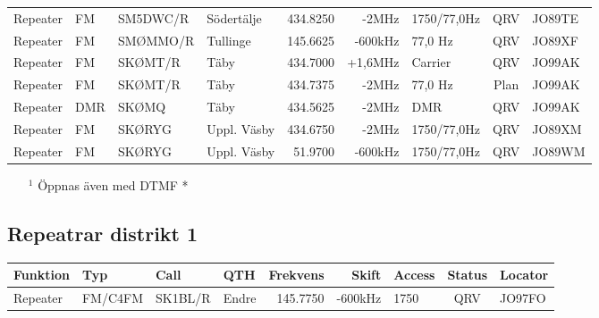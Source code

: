 \begin{landscape}
\begin{longtable}{llllrrlcl}
	Repeater          & FM           & SM5DWC/R      & Södertälje   & 434.8250          & -2MHz          & 1750/77,0Hz     & QRV             & JO89TE           \\
	Repeater          & FM           & SMØMMO/R      & Tullinge     & 145.6625          & -600kHz        & 77,0 Hz         & QRV             & JO89XF           \\
	Repeater          & FM           & SKØMT/R       & Täby         & 434.7000          & +1,6MHz        & Carrier         & QRV             & JO99AK           \\
	Repeater          & FM           & SKØMT/R       & Täby         & 434.7375          & -2MHz          & 77,0 Hz         & Plan            & JO99AK           \\
	Repeater          & DMR          & SKØMQ         & Täby         & 434.5625          & -2MHz          & DMR             & QRV             & JO99AK           \\
	Repeater          & FM           & SKØRYG        & Uppl. Väsby  & 434.6750          & -2MHz          & 1750/77,0Hz     & QRV             & JO89XM           \\
	Repeater          & FM           & SKØRYG        & Uppl. Väsby  & 51.9700           & -600kHz        & 1750/77,0Hz     & QRV             & JO89WM
\end{longtable}
\begin{itemize}
	\item[$^1$] Öppnas även med DTMF *
\end{itemize}
\normalsize

\clearpage

\subsection{Repeatrar distrikt 1}
\footnotesize
\begin{longtable}{llllrrlcl}
\textbf{Funktion} & \textbf{Typ} & \textbf{Call} & \textbf{QTH} & \textbf{Frekvens} & \textbf{Skift} & \textbf{Access} & \textbf{Status} & \textbf{Locator} \\ \hline \endhead
Repeater          & FM/C4FM      & SK1BL/R       & Endre	& 145.7750          & -600kHz        & 1750            & QRV             & JO97FO           \\
\end{longtable}
\normalsize


\end{landscape}
